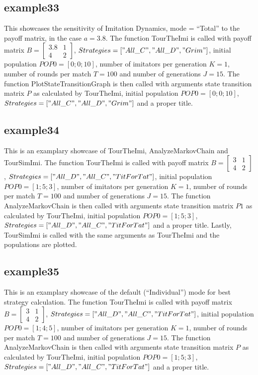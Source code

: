 \subsection{example33}
This showcases the sensitivity of Imitation Dynamics, mode = ``Total'' to the payoff matrix, in the case $a = 3.8$. The function TourTheImi is called with payoff matrix $B = \begin{bmatrix} 3.8 & 1 \\ 4 & 2 \end{bmatrix}$, $Strategies = ["All\_C", "All\_D", "Grim"]$, initial population $POP0 = [0; 0; 10]$, number of imitators per generation $K=1$, number of rounds per match $T = 100$ and number of generations $J = 15$. The function PlotStateTransitionGraph is then called with arguments state transition matrix $P$ as calculated by TourTheImi, initial population $POP0 = [0; 0; 10]$, $Strategies = ["All\_C", "All\_D", "Grim"]$ and a proper title.

\subsection{example34}
This is an examplary showcase of TourTheImi, AnalyzeMarkovChain and TourSimImi. The function TourTheImi is called with payoff matrix $B = \begin{bmatrix} 3 & 1 \\ 4 & 2 \end{bmatrix}$, $Strategies = ["All\_D", "All\_C", "TitForTat"]$, initial population $POP0 = [1; 5; 3]$, number of imitators per generation $K=1$, number of rounds per match $T = 100$ and number of generations $J = 15$. The function AnalyzeMarkovChain is then called with arguments state transition matrix $P1$ as calculated by TourTheImi, initial population $POP0 = [1; 5; 3]$, $Strategies = ["All\_D", "All\_C", "TitForTat"]$ and a proper title. Lastly, TourSimImi is called with the same arguments as TourTheImi and the populations are plotted.

\subsection{example35}
This is an examplary showcase of the default (``Individual'') mode for best strategy calculation. The function TourTheImi is called with payoff matrix $B = \begin{bmatrix} 3 & 1 \\ 4 & 2 \end{bmatrix}$, $Strategies = ["All\_D", "All\_C", "TitForTat"]$, initial population $POP0 = [1; 4; 5]$, number of imitators per generation $K=1$, number of rounds per match $T = 100$ and number of generations $J = 15$. The function AnalyzeMarkovChain is then called with arguments state transition matrix $P$ as calculated by TourTheImi, initial population $POP0 = [1; 5; 3]$, $Strategies = ["All\_D", "All\_C", "TitForTat"]$ and a proper title.

